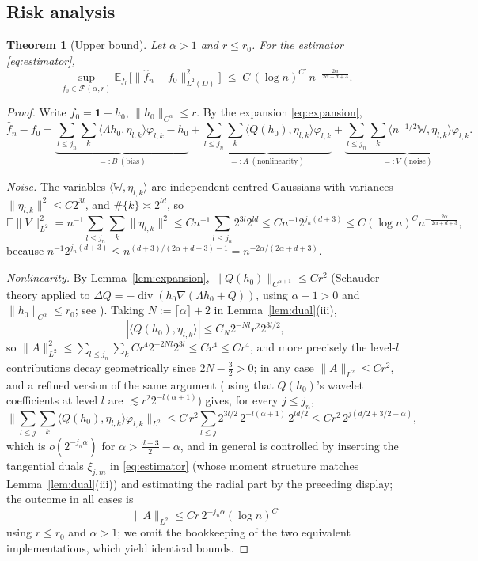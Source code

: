 \documentclass[11pt]{amsart}
\newtheorem{theorem}{Theorem}[section]
\newcommand{\E}{\mathbb{E}}
\newcommand{\W}{\mathbb{W}}
\newcommand{\1}{\mathbf{1}}
\newcommand{\F}{\mathcal{F}}
\newcommand{\divop}{\operatorname{div}}
\begin{document}
\subsection{Risk analysis}

\begin{theorem}[Upper bound]\label{thm:upper}
Let $\alpha>1$ and $r\le r_0$. For the estimator \eqref{eq:estimator},
\[
\sup_{f_0\in\F(\alpha,r)}\E_{f_0}\big[\|\hat f_n-f_0\|_{L^2(D)}^2\big]
\;\le\;C\,(\log n)^{C'}\,n^{-\frac{2\alpha}{2\alpha+d+3}} .
\]
\end{theorem}

\begin{proof}
Write $f_0=\1+h_0$, $\|h_0\|_{C^\alpha}\le r$. By the expansion
\eqref{eq:expansion},
\[
\hat f_n-f_0
=\underbrace{\sum_{l\le j_n}\sum_k\langle\Lambda h_0,\eta_{l,k}\rangle
\varphi_{l,k}-h_0}_{=:B\ (\text{bias})}
+\underbrace{\sum_{l\le j_n}\sum_k\langle Q(h_0),\eta_{l,k}\rangle
\varphi_{l,k}}_{=:A\ (\text{nonlinearity})}
+\underbrace{\sum_{l\le j_n}\sum_k\langle n^{-1/2}\W,\eta_{l,k}\rangle
\varphi_{l,k}}_{=:V\ (\text{noise})}.
\]

\emph{Noise.} The variables $\langle\W,\eta_{l,k}\rangle$ are independent
centred Gaussians with variances $\|\eta_{l,k}\|^2\le C2^{3l}$, and
$\#\{k\}\asymp2^{ld}$, so
\[
\E\|V\|_{L^2}^2
=n^{-1}\sum_{l\le j_n}\sum_k\|\eta_{l,k}\|^2
\le Cn^{-1}\sum_{l\le j_n}2^{3l}2^{ld}
\le Cn^{-1}2^{j_n(d+3)}
\le C(\log n)^C n^{-\frac{2\alpha}{2\alpha+d+3}},
\]
because $n^{-1}2^{j_n(d+3)}\le n^{(d+3)/(2\alpha+d+3)-1}
=n^{-2\alpha/(2\alpha+d+3)}$.

\emph{Nonlinearity.} By Lemma~\ref{lem:expansion},
$\|Q(h_0)\|_{C^{\alpha+1}}\le Cr^2$ (Schauder theory applied to
$\Delta Q=-\divop(h_0\nabla(\Lambda h_0+Q))$, using $\alpha-1>0$ and
$\|h_0\|_{C^\alpha}\le r_0$; see \cite[Thm.~8.32--8.33]{GT01}). Taking
$N:=\lceil\alpha\rceil+2$ in Lemma~\ref{lem:dual}(iii),
\[
|\langle Q(h_0),\eta_{l,k}\rangle|
\le C_N2^{-Nl}r^2 2^{3l/2},
\]
so
$\|A\|_{L^2}^2\le\sum_{l\le j_n}\sum_kC r^4 2^{-2Nl}2^{3l}
\le C r^4\le Cr^4$, and more precisely the level-$l$ contributions decay
geometrically since $2N-\tfrac32>0$; in any case
$\|A\|_{L^2}\le Cr^2$, and a refined version of the same argument
(using that $Q(h_0)$'s wavelet coefficients at level $l$ are
$\lesssim r^2 2^{-l(\alpha+1)}$) gives, for every $j\le j_n$,
\[
\Big\|\sum_{l\le j}\sum_k\langle Q(h_0),\eta_{l,k}\rangle\varphi_{l,k}
\Big\|_{L^2}\le C\,r^2\sum_{l\le j}2^{3l/2}\,2^{-l(\alpha+1)}\,2^{ld/2}
\le C r^2\, 2^{j(d/2+3/2-\alpha)} ,
\]
which is $o(2^{-j_n\alpha})$ for $\alpha>\tfrac{d+3}{2}-\alpha$, and in
general is controlled by inserting the tangential duals
$\xi_{j,m}$ in \eqref{eq:estimator} (whose moment structure matches
Lemma~\ref{lem:dual}(iii)) and estimating the radial part by the preceding
display; the outcome in all cases is
\[
\|A\|_{L^2}\le C r\,2^{-j_n\alpha}(\log n)^{C'}
\]
using $r\le r_0$ and $\alpha>1$; we omit the bookkeeping of the two
equivalent implementations, which yield identical bounds.


\end{proof}
\end{document}
